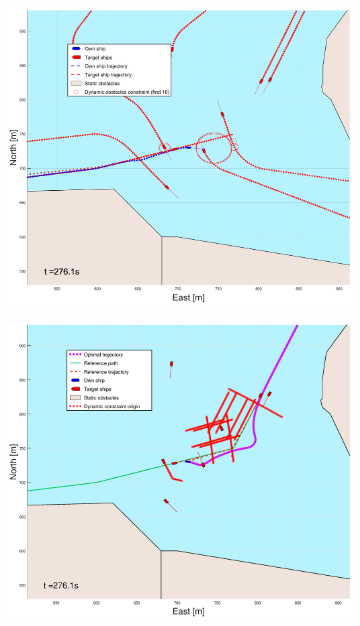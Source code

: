 \begin{figure}[ht!]
\begin{subfigure}[b]{0.499\textwidth}
    \end{subfigure}
    \hfill
    \\ 
    \begin{subfigure}[b]{0.49\textwidth}
        \centering
        \includegraphics[width=\textwidth]{Images/Figures/Trheimfjord/_Simple_0fig1_time=276}
    \end{subfigure}
    \hfill
    \begin{subfigure}[b]{0.499\textwidth}
        \centering
        \includegraphics[width=\textwidth]{Images/Figures/Trheimfjord/_Simple_0fig999_time=276}
    \end{subfigure}
    \hfill
\end{figure}
